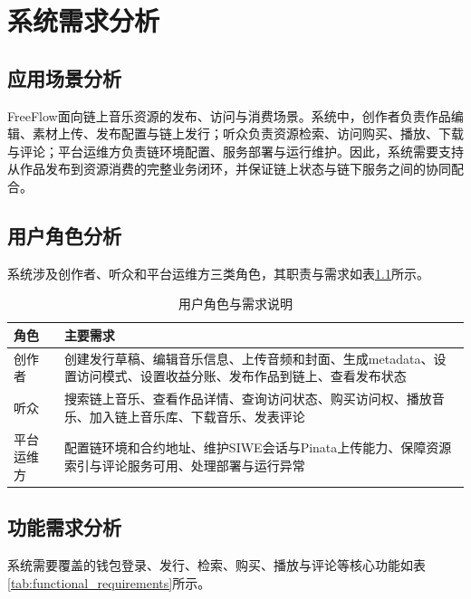 
\chapter{系统需求分析}

\section{应用场景分析}

FreeFlow面向链上音乐资源的发布、访问与消费场景。系统中，创作者负责作品编辑、素材上传、发布配置与链上发行；听众负责资源检索、访问购买、播放、下载与评论；平台运维方负责链环境配置、服务部署与运行维护。因此，系统需要支持从作品发布到资源消费的完整业务闭环，并保证链上状态与链下服务之间的协同配合。


\section{用户角色分析}

系统涉及创作者、听众和平台运维方三类角色，其职责与需求如表\ref{tab:user_roles}所示。

\begin{table}[htbp]
    \linespread{1.5}
    \songti
    \centering
    \caption{用户角色与需求说明}\label{tab:user_roles}
    \begin{tabular}{|l|p{10cm}|}
        \hline
        角色    & 主要需求                                                          \\ \hline
        创作者   & 创建发行草稿、编辑音乐信息、上传音频和封面、生成metadata、设置访问模式、设置收益分账、发布作品到链上、查看发布状态 \\ \hline
        听众    & 搜索链上音乐、查看作品详情、查询访问状态、购买访问权、播放音乐、加入链上音乐库、下载音乐、发表评论             \\ \hline
        平台运维方 & 配置链环境和合约地址、维护SIWE会话与Pinata上传能力、保障资源索引与评论服务可用、处理部署与运行异常        \\ \hline
    \end{tabular}
\end{table}

\section{功能需求分析}

系统需要覆盖的钱包登录、发行、检索、购买、播放与评论等核心功能如表\ref{tab:functional_requirements}所示。

